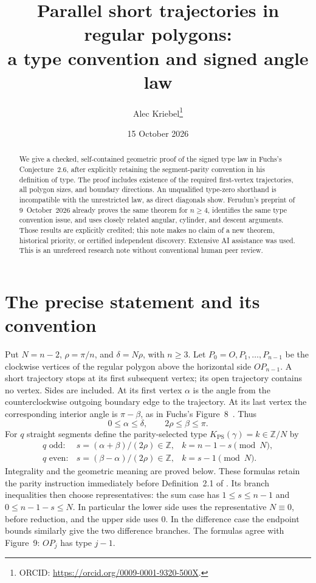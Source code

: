 \documentclass[11pt]{article}
\title{Parallel short trajectories in regular polygons:\\
a type convention and signed angle law}
\author{Alec Kriebel\thanks{ORCID: \url{https://orcid.org/0009-0001-9320-500X}.}}
\date{15 October 2026}
\newcommand{\Z}{\mathbb Z}
\newcommand{\K}{K_{\mathrm{PS}}}
\begin{document}
\maketitle
\begin{abstract}
We give a checked, self-contained geometric proof of the signed type law
in Fuchs's Conjecture~2.6, after explicitly retaining the segment-parity
convention in his definition of type. The proof includes existence of
the required first-vertex trajectories, all polygon sizes, and boundary
directions. An unqualified type-zero shorthand is incompatible with
the unrestricted law, as direct diagonals show. Ferudun's preprint of
9~October~2026 already proves the same theorem for $n\ge4$, identifies
the same type convention issue, and uses closely related angular,
cylinder, and descent arguments. Those results are explicitly credited;
this note makes no claim of a new theorem, historical priority, or
certified independent discovery. Extensive AI assistance was used.
This is an unrefereed research note without conventional human peer review.
\end{abstract}

\section{The precise statement and its convention}
Put $N=n-2$, $\rho=\pi/n$, and $\delta=N\rho$, with $n\ge3$.
Let $P_0=O,P_1,\ldots,P_{n-1}$ be the clockwise vertices of the regular
polygon above the horizontal side $OP_{n-1}$.
A short trajectory stops at its first subsequent vertex; its open
trajectory contains no vertex. Sides are included. At its first vertex
$\alpha$ is the angle from the counterclockwise outgoing boundary
edge to the trajectory. At its last vertex the corresponding interior
angle is $\pi-\beta$, as in Fuchs's Figure~8~\cite{Fuchs}. Thus
\[
0\le\alpha\le\delta,\qquad 2\rho\le\beta\le\pi.
\]
For $q$ straight segments define the parity-selected type
$\K(\gamma)=k\in\Z/N$ by
\begin{equation}\label{type}
\begin{array}{lll}
q\text{ odd}:&s=(\alpha+\beta)/(2\rho)\in\Z,&k=n-1-s\pmod N,\\
q\text{ even}:&s=(\beta-\alpha)/(2\rho)\in\Z,&k=s-1\pmod N.
\end{array}
\end{equation}
Integrality and the geometric meaning are proved below. These formulas
retain the parity instruction immediately before Definition~2.1 of
\cite{Fuchs}. Its branch inequalities then choose representatives:
the sum case has $1\le s\le n-1$ and $0\le n-1-s\le N$.
In particular the lower side uses the representative $N\equiv0$,
before reduction, and the upper side uses $0$. In the difference case
the endpoint bounds similarly give the two difference branches.
The formulas agree with Figure~9: $OP_j$ has type $j-1$.
\end{document}
